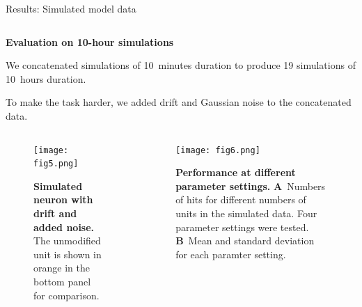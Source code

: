 \documentclass{beamer}
\renewcommand{\emph}{\textbf}
\newenvironment{wideitemize}{\itemize\addtolength{\itemsep}{.2em}\addtolength{\labelsep}{.1ex}}{\enditemize}
\begin{document}
\begin{frame}[t]
\begin{columns}[T]
\begin{column}{.49\linewidth}
\begin{block}{Results: Simulated model data}
\begin{columns}[T]
\begin{column}{.95\linewidth}
\begin{columns}[T]
\begin{column}{.48\linewidth}
\end{column}
\end{columns}

\vspace{2em}
\emph{Evaluation on 10-hour simulations}
\begin{wideitemize}
\item We concatenated simulations of 10~minutes duration to produce 19 simulations of 10~hours duration.
\item To make the task harder, we added drift and Gaussian noise to the concatenated data.
\end{wideitemize}
\begin{columns}[T]
\begin{column}{.47\linewidth}
\begin{figure}
\begin{center}
\texttt{[image: fig5.png]}
\end{center}
\caption{\emph{Simulated neuron with drift and added noise.} The unmodified unit is shown in orange in the bottom panel for comparison.}
\end{figure}
\end{column}

\begin{column}{.47\linewidth}
\begin{figure}
\begin{center}
\texttt{[image: fig6.png]}
\end{center}
\caption{\emph{Performance at different parameter settings.} \textbf{A}~Numbers of hits for different numbers of units in the simulated data. Four parameter settings were tested. \textbf{B}~Mean and standard deviation for each paramter setting.}
\end{figure}
\vspace{-1.6em}
\end{column}
\end{columns}
\end{column}
\end{columns}
\end{block}


\end{column} %



\end{columns}
\end{frame}
\end{document}
